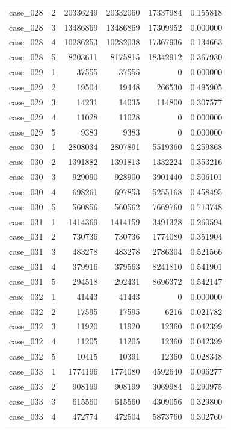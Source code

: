 \begin{longtable}{lrrrrr}
case\_028 & 2 & 20336249 & 20332060 & 17337984 & 0.155818 \\
case\_028 & 3 & 13486869 & 13486869 & 17309952 & 0.000000 \\
case\_028 & 4 & 10286253 & 10282038 & 17367936 & 0.134663 \\
case\_028 & 5 & 8203611 & 8175815 & 18342912 & 0.367930 \\
case\_029 & 1 & 37555 & 37555 & 0 & 0.000000 \\
case\_029 & 2 & 19504 & 19448 & 266530 & 0.495905 \\
case\_029 & 3 & 14231 & 14035 & 114800 & 0.307577 \\
case\_029 & 4 & 11028 & 11028 & 0 & 0.000000 \\
case\_029 & 5 & 9383 & 9383 & 0 & 0.000000 \\
case\_030 & 1 & 2808034 & 2807891 & 5519360 & 0.259868 \\
case\_030 & 2 & 1391882 & 1391813 & 1332224 & 0.353216 \\
case\_030 & 3 & 929090 & 928900 & 3901440 & 0.506101 \\
case\_030 & 4 & 698261 & 697853 & 5255168 & 0.458495 \\
case\_030 & 5 & 560856 & 560562 & 7669760 & 0.713748 \\
case\_031 & 1 & 1414369 & 1414159 & 3491328 & 0.260594 \\
case\_031 & 2 & 730736 & 730736 & 1774080 & 0.351904 \\
case\_031 & 3 & 483278 & 483278 & 2786304 & 0.521566 \\
case\_031 & 4 & 379916 & 379563 & 8241810 & 0.541901 \\
case\_031 & 5 & 294518 & 292431 & 8696372 & 0.542147 \\
case\_032 & 1 & 41443 & 41443 & 0 & 0.000000 \\
case\_032 & 2 & 17595 & 17595 & 6216 & 0.021782 \\
case\_032 & 3 & 11920 & 11920 & 12360 & 0.042399 \\
case\_032 & 4 & 11205 & 11205 & 12360 & 0.042399 \\
case\_032 & 5 & 10415 & 10391 & 12360 & 0.028348 \\
case\_033 & 1 & 1774196 & 1774080 & 4592640 & 0.096277 \\
case\_033 & 2 & 908199 & 908199 & 3069984 & 0.290975 \\
case\_033 & 3 & 615560 & 615560 & 4309056 & 0.329800 \\
case\_033 & 4 & 472774 & 472504 & 5873760 & 0.302760 \\

\end{longtable}
